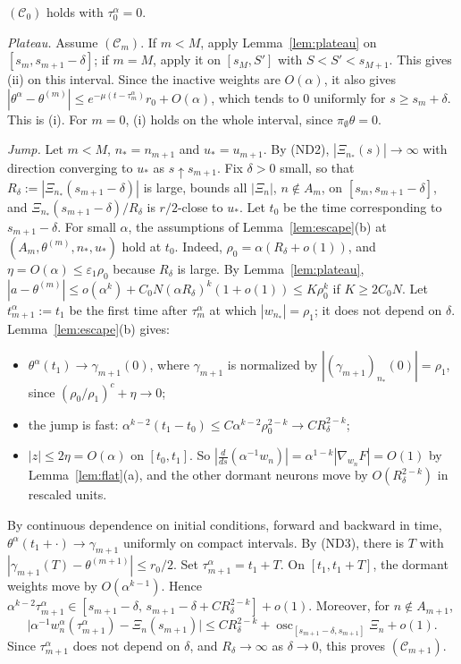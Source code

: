 \documentclass[11pt]{article}
\theoremstyle{definition}
\theoremstyle{remark}
\newcommand{\eps}{\varepsilon}
\newcommand{\ND}[1]{\textup{(ND#1)}}
\begin{document}
\smallskip\noindent$(\mathcal C_0)$ holds with $\tau^\alpha_0=0$.

\emph{Plateau.} Assume $(\mathcal C_m)$. If $m<M$, apply Lemma~\ref{lem:plateau} on $[s_m,s_{m+1}-\delta]$; if $m=M$, apply it on $[s_M,S']$ with $S<S'<s_{M+1}$. This gives (ii) on this interval. Since the inactive weights are $O(\alpha)$, it also gives $|\theta^\alpha-\theta^{(m)}|\le e^{-\mu(t-\tau^\alpha_m)}r_0+O(\alpha)$, which tends to $0$ uniformly for $s\ge s_m+\delta$. This is (i). For $m=0$, (i) holds on the whole interval, since $\pi_\emptyset\theta=0$.

\emph{Jump.} Let $m<M$, $n_*=n_{m+1}$ and $u_*=u_{m+1}$. By \ND2, $|\Xi_{n_*}(s)|\to\infty$ with direction converging to $u_*$ as $s\uparrow s_{m+1}$. Fix $\delta>0$ small, so that $R_\delta:=|\Xi_{n_*}(s_{m+1}-\delta)|$ is large, bounds all $|\Xi_n|$, $n\notin A_m$, on $[s_m,s_{m+1}-\delta]$, and $\Xi_{n_*}(s_{m+1}-\delta)/R_\delta$ is $r/2$-close to $u_*$. Let $t_0$ be the time corresponding to $s_{m+1}-\delta$. For small $\alpha$, the assumptions of Lemma~\ref{lem:escape}(b) at $(A_m,\theta^{(m)},n_*,u_*)$ hold at $t_0$. Indeed, $\rho_0=\alpha(R_\delta+o(1))$, and $\eta=O(\alpha)\le\eps_1\rho_0$ because $R_\delta$ is large. By Lemma~\ref{lem:plateau}, $|a-\theta^{(m)}|\le o(\alpha^k)+C_0N(\alpha R_\delta)^k(1+o(1))\le K\rho_0^k$ if $K\ge2C_0N$. Let $t^\alpha_{m+1}:=t_1$ be the first time after $\tau^\alpha_m$ at which $|w_{n_*}|=\rho_1$; it does not depend on $\delta$. Lemma~\ref{lem:escape}(b) gives:
\begin{itemize}[nosep]
\item $\theta^\alpha(t_1)\to\gamma_{m+1}(0)$, where $\gamma_{m+1}$ is normalized by $|(\gamma_{m+1})_{n_*}(0)|=\rho_1$, since $(\rho_0/\rho_1)^c+\eta\to0$;
\item the jump is fast: $\alpha^{k-2}(t_1-t_0)\le C\alpha^{k-2}\rho_0^{2-k}\to CR_\delta^{2-k}$;
\item $|z|\le2\eta=O(\alpha)$ on $[t_0,t_1]$. So $|\frac{d}{ds}(\alpha^{-1}w_n)|=\alpha^{1-k}|\nabla_{w_n}F|=O(1)$ by Lemma~\ref{lem:flat}(a), and the other dormant neurons move by $O(R_\delta^{2-k})$ in rescaled units.
\end{itemize}
By continuous dependence on initial conditions, forward and backward in time, $\theta^\alpha(t_1+\cdot)\to\gamma_{m+1}$ uniformly on compact intervals. By \ND3, there is $T$ with $|\gamma_{m+1}(T)-\theta^{(m+1)}|\le r_0/2$. Set $\tau^\alpha_{m+1}=t_1+T$. On $[t_1,t_1+T]$, the dormant weights move by $O(\alpha^{k-1})$. Hence $\alpha^{k-2}\tau^\alpha_{m+1}\in[s_{m+1}-\delta,\,s_{m+1}-\delta+CR_\delta^{2-k}]+o(1)$. Moreover, for $n\notin A_{m+1}$,
\[
\big|\alpha^{-1}w_n^\alpha(\tau^\alpha_{m+1})-\Xi_n(s_{m+1})\big|\le CR_\delta^{2-k}+\operatorname{osc}_{[s_{m+1}-\delta,s_{m+1}]}\Xi_n+o(1).
\]
Since $\tau^\alpha_{m+1}$ does not depend on $\delta$, and $R_\delta\to\infty$ as $\delta\to0$, this proves $(\mathcal C_{m+1})$.
\end{document}
